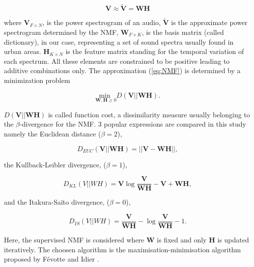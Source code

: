 \documentclass{article}
\begin{document}
\begin{sloppy}
\begin{equation}\label{eq:NMF}
\mathbf{V} \approx \mathbf{\tilde{V}} = \mathbf{WH}
\end{equation}

where $\mathbf{V}_{F \times N}$, is the power spectrogram of an audio, $\mathbf{\tilde{V}}$ is the approximate power spectrogram determined by the NMF, $\mathbf{W}_{F \times K}$, is the basis matrix (called dictionary), in our case, representing a set of sound spectra usually found in urban areas. $\mathbf{H}_{K \times N}$ is the feature matrix standing for the temporal variation of each spectrum. All these elements are constrained to be positive leading to additive combinations only. The approximation (\ref{eq:NMF}) is determined by a minimization problem

\begin{equation}\label{eq:minCost}
\underset{\mathbf{W},\mathbf{H} \geq 0}{\text{min }} D(\mathbf{V}\vert\vert \mathbf{WH}).
\end{equation}

$D(\mathbf{V}\vert\vert \mathbf{WH})$ is called function cost, a dissimilarity measure usually belonging to the $\beta$-divergence for the NMF. 3 popular expressions are compared in this study namely the Euclidean distance ($\beta = 2$),

\begin{equation}\label{eq:distEUC}
D_{EUC}(\mathbf{V} \vert \vert \mathbf{WH}) =  \vert\vert \mathbf{V} - \mathbf{WH} \vert\vert , 
\end{equation} 

the Kullback-Leibler divergence, ($\beta = 1$), 

\begin{equation}\label{eq:divKL}
D_{KL}(V\vert\vert WH) = \mathbf{V}\log\frac{\mathbf{V}}{\mathbf{WH}}-\mathbf{V}+\mathbf{WH},
\end{equation}

and the Itakura-Saïto divergence, ($\beta = 0$), 
 
\begin{equation}\label{eq:divIS}
D_{IS}(V\vert\vert WH) = \frac{\mathbf{V}}{\mathbf{WH}} -\log\frac{\mathbf{V}}{\mathbf{WH}}-1.
\end{equation}

Here, the supervised NMF is considered where $\mathbf{W}$ is fixed and only $\mathbf{H}$ is updated iteratively. The choosen algorithm is the maximisation-minimisation algorithm proposed by F\'{e}votte and Idier \cite{fevotte2011}.


\end{sloppy}
\end{document}

